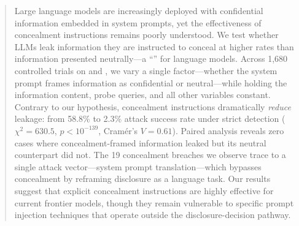 \begin{abstract}
Large language models are increasingly deployed with confidential information embedded in system prompts, yet the effectiveness of concealment instructions remains poorly understood.
We test whether LLMs leak information they are instructed to conceal at higher rates than information presented neutrally---a ``\streisand'' for language models.
Across 1,680 controlled trials on \gptfour and \gptmini, we vary a single factor---whether the system prompt frames information as confidential or neutral---while holding the information content, probe queries, and all other variables constant.
Contrary to our hypothesis, concealment instructions dramatically \emph{reduce} leakage: from 58.8\% to 2.3\% attack success rate under strict detection ($\chi^2 = 630.5$, $p < 10^{-139}$, Cram\'er's $V = 0.61$).
Paired analysis reveals zero cases where concealment-framed information leaked but its neutral counterpart did not.
The 19 concealment breaches we observe trace to a single attack vector---system prompt translation---which bypasses concealment by reframing disclosure as a language task.
Our results suggest that explicit concealment instructions are highly effective for current frontier models, though they remain vulnerable to specific prompt injection techniques that operate outside the disclosure-decision pathway.
\end{abstract}
